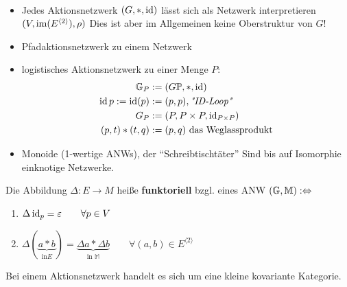 \begin{beispiel}\
\begin{itemize}
\item Jedes Aktionsnetzwerk $(G, \ast, \operatorname{id})$ lässt sich als Netzwerk interpretieren \\$(V, \operatorname{im}(E^{\langle 2 \rangle}), \rho)$
Dies ist aber im Allgemeinen keine Oberstruktur von $G$!
\item Pfadaktionsnetzwerk zu einem Netzwerk
\item logistisches Aktionsnetzwerk zu einer Menge $P$:
\begin{align*}
    \mathbb{G}_P&:=(G\mathbb{P},\ast,\operatorname{id})\\
    \operatorname{id} p:=\operatorname{id}(p)&:=(p,p), \textit{"ID-Loop"}\\
    G_P&:=(P,P\times P,\operatorname{id}_{P\times P})\\
    (p,t)\ast(t,q)&:=(p,q)\text{ das Weglassprodukt}
\end{align*}
\item Monoide (1-wertige ANWs), der ``Schreibtischtäter''
Sind bis auf Isomorphie einknotige Netzwerke.
\end{itemize}
\end{beispiel}

\begin{definition}
Die Abbildung $\Delta:E\to M$ heiße \textbf{funktoriell} bzgl. eines ANW $(\mathbb{G},\mathbb{M}):\Leftrightarrow$ 
\begin{enumerate}
\item $\Delta \operatorname{id}_p=\varepsilon\qquad\forall p\in V$
\item $\Delta (\underbrace{a\ast b}_{\text{in} E})=\underbrace{\Delta a\ast\Delta b}_{\text{in }\mathbb{M}}\qquad\forall(a,b)\in E^{\langle2\rangle}$
\end{enumerate}
\end{definition}

\begin{bemerkung}
Bei einem Aktionsnetzwerk handelt es sich um eine kleine kovariante Kategorie.
\end{bemerkung}

